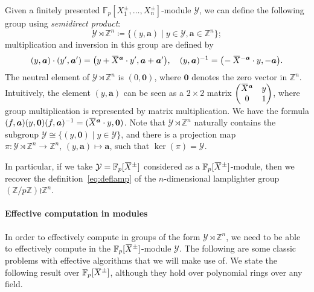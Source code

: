 \documentclass[a4paper,UKenglish,cleveref, autoref, thm-restate]{lipics-v2021}
\newcommand{\Z}{\mathbb{Z}}
\newcommand{\F}{\mathbb{F}}
\newcommand{\mY}{\mathcal{Y}}
\newcommand{\ba}{\boldsymbol{a}}
\newcommand{\bzer}{\boldsymbol{0}}
\newcommand{\oX}{\mkern 1.5mu\overline{\mkern-1.5mu X \mkern-1.5mu}\mkern 1.5mu}
\theoremstyle{definition}
\theoremstyle{definition}
\theoremstyle{definition}
\begin{document}
Given a finitely presented $\F_p[X_1^{\pm}, \ldots, X_n^{\pm}]$-module $\mY$, we can define the following group using \emph{semidirect product}:
\begin{equation}\label{eq:defsemi}
\mY \rtimes \Z^n \coloneqq \{(y, \ba) \mid y \in \mY, \ba \in \Z^n\};
\end{equation}
multiplication and inversion in this group are defined by
\begin{equation}\label{eq:defsemi2}
(y, \ba) \cdot (y', \ba') = \big(y + \oX^{\ba} \cdot y', \ba + \ba'\big), \quad (y, \ba)^{-1} = \big(\! - \oX^{-\ba} \cdot y, -\ba\big).
\end{equation}
The neutral element of $\mY \rtimes \Z^n$ is $(0, \bzer)$, where $\bzer$ denotes the zero vector in $\Z^n$.
Intuitively, the element $(y, \ba)$ can be seen as a $2 \times 2$ matrix
$
\begin{pmatrix}
\oX^{\ba} & y \\
0 & 1 \\
\end{pmatrix}
$, where group multiplication is represented by matrix multiplication.
We have the formula $(f, \ba)(y, \bzer)(f, \ba)^{-1} = (\oX^{\ba} \cdot y, \bzer)$.
Note that $\mY \rtimes \Z^n$ naturally contains the subgroup $\mY \cong \{(y, \bzer) \mid y \in \mY\}$, and there is a projection map $\pi \colon \mY \rtimes \Z^n \rightarrow \Z^n, \, (y, \ba) \mapsto \ba$, such that $\ker(\pi) = \mY$.

In particular, if we take $\mY = \F_p[\oX^{\pm}]$ considered as a $\F_p[\oX^{\pm}]$-module, then we recover the definition~\eqref{eq:deflamp} of the $n$-dimensional lamplighter group $(\Z/p\Z) \wr \Z^n$.

\paragraph*{Effective computation in modules}
In order to effectively compute in groups of the form $\mY \rtimes \Z^n$, we need to be able to effectively compute in the $\F_p[\oX^{\pm}]$-module $\mY$.
The following are some classic problems with effective algorithms that we will make use of.
We state the following result over $\F_p[\oX^{\pm}]$, although they hold over polynomial rings over any field.
\end{document}
